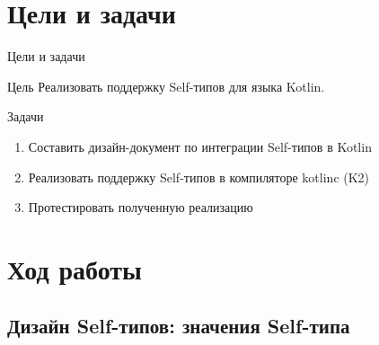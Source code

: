 \documentclass[handout,aspectratio=169,usenames,dvipsnames]{beamer}
\begin{document}
\section{Цели и задачи}

\begin{frame}[fragile]{Цели и задачи}
    \begin{block}{Цель}
        Реализовать поддержку Self-типов для языка Kotlin.
    \end{block}
    \begin{block}{Задачи}
        \begin{enumerate}
            \item Составить дизайн-документ по интеграции Self-типов в Kotlin
            \item Реализовать поддержку Self-типов в компиляторе kotlinc (K2)
            \item Протестировать полученную реализацию
        \end{enumerate}
    \end{block}
\end{frame}


\section{Ход работы}

\subsection{Дизайн Self-типов: значения Self-типа}
\end{document}

